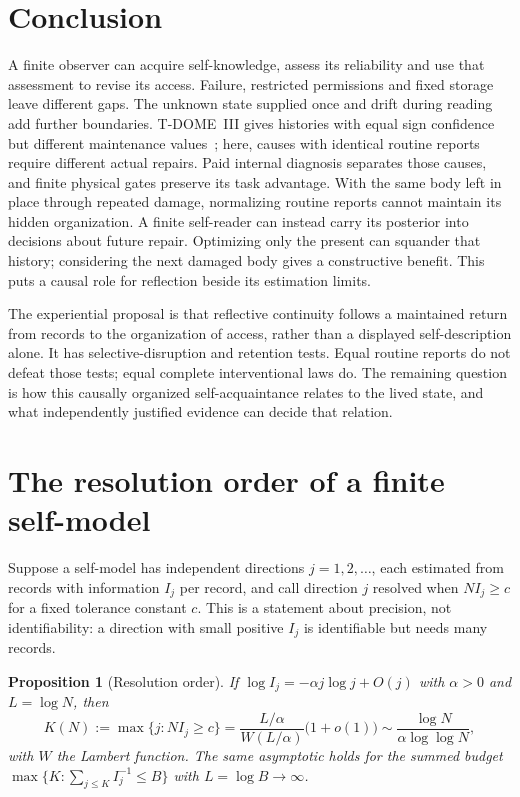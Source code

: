 \documentclass[12pt]{article}
\newtheorem{proposition}[theorem]{Proposition}
\theoremstyle{definition}
\theoremstyle{remark}
\begin{document}
\section{Conclusion}\label{sec:8}

A finite observer can acquire self-knowledge, assess its reliability
and use that assessment to revise its access. Failure, restricted
permissions and fixed storage leave different gaps. The unknown state
supplied once and drift during reading add further boundaries.
T-DOME~III gives histories with equal sign confidence but different
maintenance values~\cite{TDOMEIII}; here, causes with identical routine
reports require different actual repairs. Paid internal diagnosis
separates those causes, and finite physical gates preserve its task
advantage. With the same body left in place through repeated damage,
normalizing routine reports cannot maintain its hidden organization.
A finite self-reader can instead carry its posterior into decisions
about future repair. Optimizing only the present can squander that
history; considering the next damaged body gives a constructive benefit.
This puts a causal role for reflection beside its estimation
limits.

The experiential proposal is that reflective continuity follows a
maintained return from records to the organization of access, rather
than a displayed self-description alone. It has selective-disruption
and retention tests. Equal routine reports do not defeat those tests;
equal complete interventional laws do. The remaining question is how
this causally organized self-acquaintance relates to the lived state,
and what independently justified evidence can decide that relation.

\appendix

\section{The resolution order of a finite self-model}\label{sec:horizon}

Suppose a self-model has independent directions $j=1,2,\dots$, each estimated from records with information $I_j$ per record, and call direction $j$ resolved when $NI_j\ge c$ for a fixed tolerance constant $c$. This is a statement about precision, not identifiability: a direction with small positive $I_j$ is identifiable but needs many records.

\begin{proposition}[Resolution order]\label{prop:horizon}
If $\log I_j=-\alpha j\log j+O(j)$ with $\alpha>0$ and $L=\log N$, then
\begin{equation}\label{eq:horizon}
K(N):=\max\{j:NI_j\ge c\}=\frac{L/\alpha}{W(L/\alpha)}\bigl(1+o(1)\bigr)\sim\frac{\log N}{\alpha\log\log N},
\end{equation}
with $W$ the Lambert function. The same asymptotic holds for the summed budget $\max\{K:\sum_{j\le K}I_j^{-1}\le B\}$ with $L=\log B\to\infty$.
\end{proposition}
\end{document}
